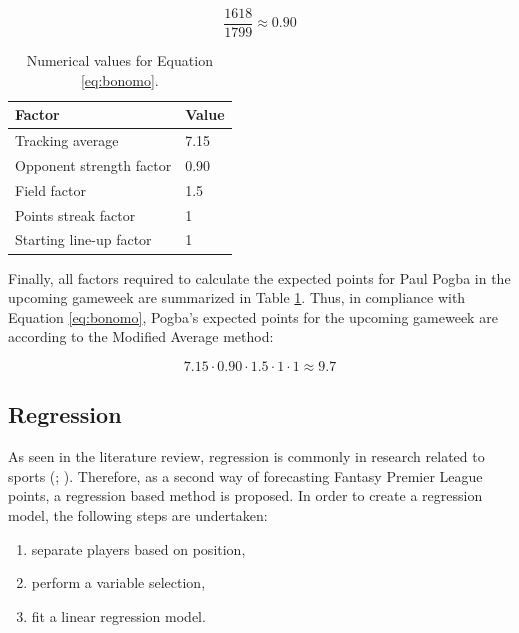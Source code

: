 \begin{equation*}
    \frac{1618}{1799} \approx 0.90
\end{equation*}

\begin{table}[H]
\centering
\begin{tabular}{|l|l|}
\hline
Factor &  Value \\ 
            \hline
Tracking average &  7.15\\
Opponent strength factor & 0.90\\
Field factor  &  1.5 \\
Points streak factor  & 1 \\
Starting line-up factor & 1\\
\hline
\end{tabular}
\caption{Numerical values for Equation \ref{eq:bonomo}.}
\label{tab:example_modified_average}
\end{table}

Finally, all factors required to calculate the expected points for Paul Pogba in the upcoming gameweek are summarized in Table \ref{tab:example_modified_average}. Thus, in compliance with Equation \ref{eq:bonomo}, Pogba's expected points for the upcoming gameweek are according to the Modified Average method:

\begin{equation*} \label{eq:pogba_ma}
    7.15 \cdot 0.90 \cdot 1.5 \cdot 1 \cdot 1 \approx 9.7
\end{equation*}




\subsection{Regression}
\label{Sol_approach_regression}

As seen in the literature review, regression is commonly in research related to sports (\cite{vabo}; \cite{Yang}). Therefore, as a second way of forecasting Fantasy Premier League points, a regression based method is proposed. In order to create a regression model, the following steps are undertaken:

\begin{enumerate} [label=(\roman*)]
    \item separate players based on position,
    \item perform a variable selection,
    \item fit a linear regression model.
\end{enumerate}

